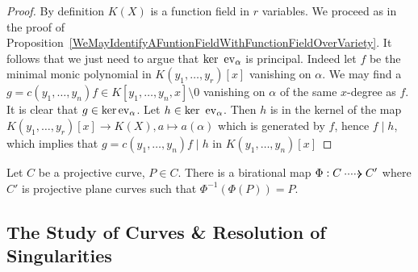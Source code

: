     \begin{proof}
        By definition $K(X)$ is a function field in $r$ variables. We proceed as in the proof of Proposition~\ref{WeMayIdentifyAFuntionFieldWithFunctionFieldOverVariety}. It follows that we just need to argue that $\ker \ \mathrm{ev}_\alpha$ is principal. Indeed let $f$ be the minimal monic polynomial in $K(y_1,\dots,y_r)[x]$ vanishing on $\alpha$. We may find a $g=c(y_1,\dots,y_n)f\in K[y_1,\dots,y_n,x]\setminus 0$ vanishing on $\alpha$ of the same $x$-degree as $f$. It is clear that $g\in \ker \mathrm{ev}_\alpha$. Let $h\in \ker\ \ev_\alpha$. Then $h$ is in the kernel of the map $K(y_1,\dots,y_r)[x]\rightarrow K(X), a\mapsto a(\alpha)$ which is generated by $f$, hence $f\mid h$, which implies that $g=c(y_1,\dots,y_n)f \mid h$ in $K(y_1,\dots,y_n)[x]$
    \end{proof}
    \begin{proposition}
        Let $C$ be a projective curve, $P\in C$. There is a birational map $\Phi: C \dottedarrow C'$ where $C'$ is projective plane curves such that $\Phi^{-1}(\Phi(P))=P$. 
    \end{proposition}
\subsection{The Study of Curves \& Resolution of Singularities}
